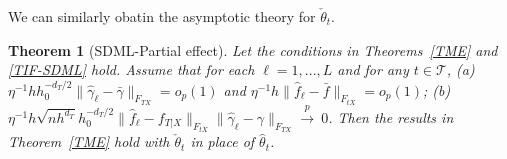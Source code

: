 \documentclass[lettersize, 12pt]{article}
\newtheorem{theorem}{Theorem}
\newtheorem{remark}{Remark}
\begin{document}
We can similarly obatin the asymptotic theory for $\check\theta_t$.
\begin{theorem}[SDML-Partial effect]
Let the conditions in Theorems~\ref{TME} and \ref{TIF-SDML} hold.
Assume that 
for each $\ell= 1,...,L$ and for any $t \in \mathcal{T}$,
(a)~$\eta^{-1}h h_0^{-d_T/2}\big\|\hat \gamma_\ell - \bar \gamma \big\|_{F_{TX}} = o_p(1)$ and 
$\eta^{-1}h\big\|\hat f_\ell- \bar f \big\|_{F_{tX}} = o_p(1)$;
(b)~$\eta^{-1}h\sqrt{nh^{d_T}} h_0^{-d_T/2}\big\| \hat f_\ell- f_{T|X} \big\|_{F_{tX}}  \big\| \hat\gamma_\ell - \gamma\big\|_{F_{TX}}  \stackrel{p}{\rightarrow}~0$.
Then the results in Theorem~\ref{TME} hold
with $\check\theta_t$ in place of $\hat\theta_t$.
\label{TME-SDML}
\end{theorem}






\end{document}
